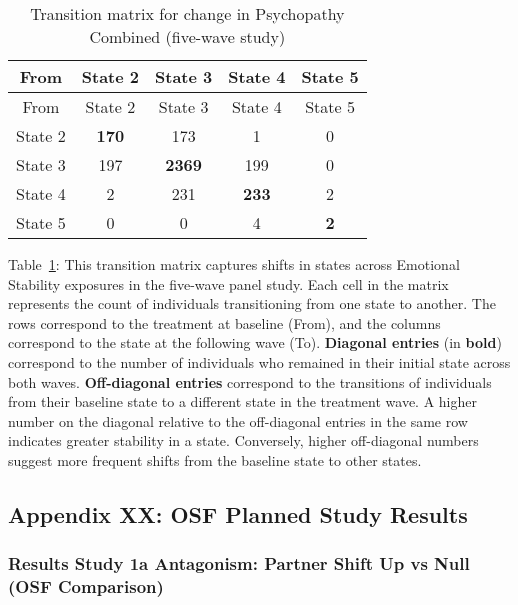 \documentclass[
  single column]{article}
\begin{document}
\begin{longtable}[]{@{}ccccc@{}}
\caption{Transition matrix for change in Psychopathy Combined (five-wave
study)}\label{tbl-table-transition-psychopathy-combined-long}\tabularnewline
\toprule\noalign{}
From & State 2 & State 3 & State 4 & State 5 \\
\midrule\noalign{}
\endfirsthead
\toprule\noalign{}
From & State 2 & State 3 & State 4 & State 5 \\
\midrule\noalign{}
\endhead
\bottomrule\noalign{}
\endlastfoot
State 2 & \textbf{170} & 173 & 1 & 0 \\
State 3 & 197 & \textbf{2369} & 199 & 0 \\
State 4 & 2 & 231 & \textbf{233} & 2 \\
State 5 & 0 & 0 & 4 & \textbf{2} \\
\end{longtable}

Table~\ref{tbl-table-transition-psychopathy-combined-long}: This
transition matrix captures shifts in states across Emotional Stability
exposures in the five-wave panel study. Each cell in the matrix
represents the count of individuals transitioning from one state to
another. The rows correspond to the treatment at baseline (From), and
the columns correspond to the state at the following wave (To).
\textbf{Diagonal entries} (in \textbf{bold}) correspond to the number of
individuals who remained in their initial state across both waves.
\textbf{Off-diagonal entries} correspond to the transitions of
individuals from their baseline state to a different state in the
treatment wave. A higher number on the diagonal relative to the
off-diagonal entries in the same row indicates greater stability in a
state. Conversely, higher off-diagonal numbers suggest more frequent
shifts from the baseline state to other states.

\newpage{}

\subsection{Appendix XX: OSF Planned Study Results}\label{appendix-xx}

\subsubsection{Results Study 1a Antagonism: Partner Shift Up vs Null
(OSF
Comparison)}\label{results-study-1a-antagonism-partner-shift-up-vs-null-osf-comparison}
\end{document}
